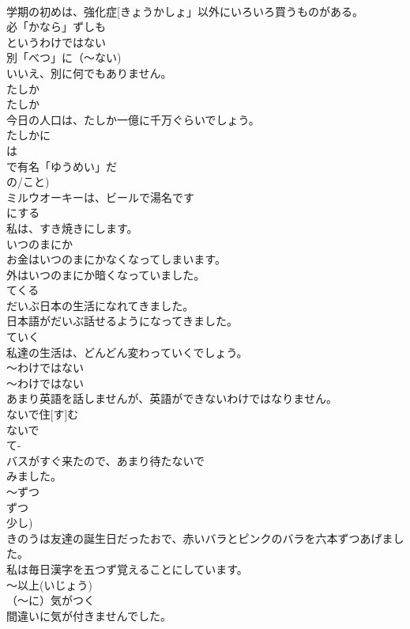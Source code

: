 \documentclass[8pt]{extreport}
\begin{document}
\begin{CJK}{UTF8}{min}
\\	学期の初めは、強化症[きょうかしょ」以外にいろいろ買うものがある。
\\	必「かなら」ずしも 
\\	というわけではない	
\\	別「べつ」に（～ない)	
\\	いいえ、別に何でもありません。
\\	たしか	
\\	たしか 
\\	今日の人口は、たしか一億に千万ぐらいでしょう。 
\\	たしかに 
\\	は
\\	で有名「ゆうめい」だ	
\\	の/こと) 
\\	ミルウオーキーは、ビールで湯名です 
\\	にする	
\\	私は、すき焼きにします。
\\	いつのまにか	
\\	お金はいつのまにかなくなってしまいます。
\\	外はいつのまにか暗くなっていました。
\\	てくる	
\\	だいぶ日本の生活になれてきました。
\\	日本語がだいぶ話せるようになってきました。
\\	ていく	
\\	私達の生活は、どんどん変わっていくでしょう。
\\	～わけではない	
\\	～わけではない 
\\	あまり英語を話しませんが、英語ができないわけではなりません。
\\	ないで住[す]む	
\\	ないで 
\\	て-
\\	バスがすぐ来たので、あまり待たないで
\\	みました。
\\	～ずつ	
\\	ずつ 
\\	少し) 
\\	きのうは友達の誕生日だったおで、赤いバラとピンクのバラを六本ずつあげました。
\\	私は毎日漢字を五つず覚えることにしています。
\\	～以上(いじょう)	
\\	（～に）気がつく	
\\	間違いに気が付きませんでした。

\end{CJK}
\end{document}
